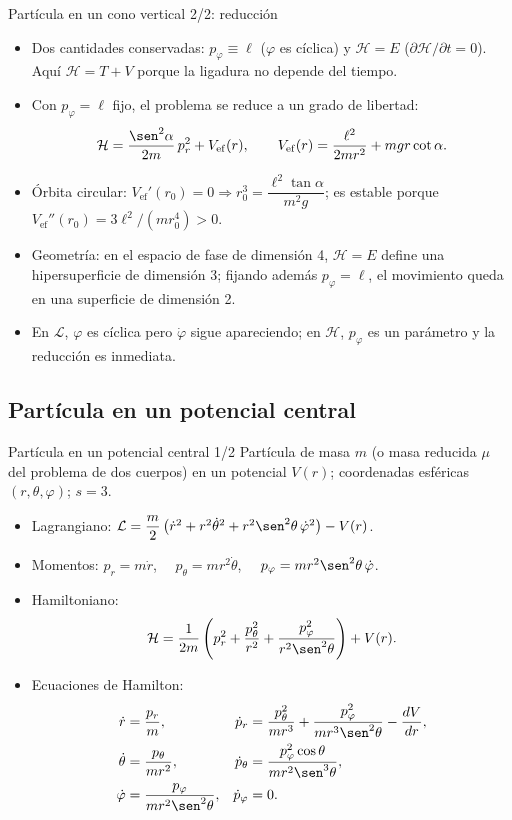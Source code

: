 \documentclass[spanish]{beamer}
\newcommand{\Lag}{\mathcal{L}}               %
\newcommand{\Ham}{\mathcal{H}}               %
\begin{document}
\begin{frame}{Partícula en un cono vertical 2/2: reducción}
\begin{itemize}[<+->]
  \item Dos cantidades conservadas: $p_\varphi\equiv\ell$ ($\varphi$ es cíclica) y
        $\Ham=E$ ($\partial\Ham/\partial t=0$). Aquí $\Ham=T+V$ porque la ligadura
        no depende del tiempo.
  \item Con $p_\varphi=\ell$ fijo, el problema se reduce a un grado de libertad:
        \[
          \Ham=\frac{\sen^2\alpha}{2m}\,p_r^2+V_{\mathrm{ef}}(r),\qquad
          V_{\mathrm{ef}}(r)=\frac{\ell^2}{2mr^2}+mgr\cot\alpha .
        \]
  \item Órbita circular: $V_{\mathrm{ef}}'(r_0)=0\Rightarrow
        r_0^3=\dfrac{\ell^2\tan\alpha}{m^2g}$; es estable porque
        $V_{\mathrm{ef}}''(r_0)=3\ell^2/(mr_0^4)>0$.
  \item Geometría: en el espacio de fase de dimensión 4, $\Ham=E$ define una
        hipersuperficie de dimensión 3; fijando además $p_\varphi=\ell$, el movimiento
        queda en una superficie de dimensión 2.
  \item En $\Lag$, $\varphi$ es cíclica pero $\dot\varphi$ sigue apareciendo; en $\Ham$,
        $p_\varphi$ es un parámetro y la reducción es inmediata.
\end{itemize}
\end{frame}

\subsection{Partícula en un potencial central}
\begin{frame}{Partícula en un potencial central 1/2}
\small
Partícula de masa $m$ (o masa reducida $\mu$ del problema de dos cuerpos) en un
potencial $V(r)$; coordenadas esféricas $(r,\theta,\varphi)$; $s=3$.
\par\normalsize
\begin{itemize}[<+->]
  \item Lagrangiano:
        $\Lag=\dfrac m2\left(\dot r^2+r^2\dot\theta^2+r^2\sen^2\theta\,\dot\varphi^2\right)-V(r)$.
  \item Momentos:
        $p_r=m\dot r$, $\quad p_\theta=mr^2\dot\theta$, $\quad p_\varphi=mr^2\sen^2\theta\,\dot\varphi$.
  \item Hamiltoniano:
        \[
          \Ham=\frac{1}{2m}\left(p_r^2+\frac{p_\theta^2}{r^2}
               +\frac{p_\varphi^2}{r^2\sen^2\theta}\right)+V(r).
        \]
  \item Ecuaciones de Hamilton:
        \begin{align*}
          \dot r&=\frac{p_r}{m}, &
          \dot p_r&=\frac{p_\theta^2}{mr^3}+\frac{p_\varphi^2}{mr^3\sen^2\theta}-\frac{dV}{dr},\\
          \dot\theta&=\frac{p_\theta}{mr^2}, &
          \dot p_\theta&=\frac{p_\varphi^2\cos\theta}{mr^2\sen^3\theta},\\
          \dot\varphi&=\frac{p_\varphi}{mr^2\sen^2\theta}, &
          \dot p_\varphi&=0 .
        \end{align*}
\end{itemize}
\end{frame}
\end{document}
